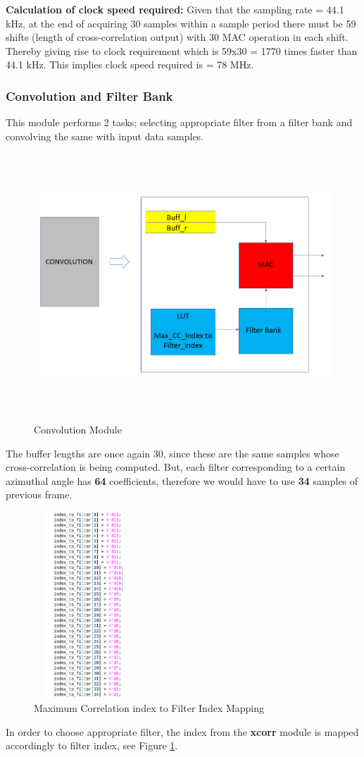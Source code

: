 \documentclass[BTech]{nitkdiss}
\begin{document}
\textbf{Calculation of clock speed required:} Given that the sampling rate = 44.1 kHz, at the end of acquiring 30 samples within a sample period there must be 59 shifts (length of cross-correlation output) with 30 MAC operation in each shift. Thereby giving rise to clock requirement which is 59x30 = 1770 times faster than 44.1 kHz. This implies clock speed required is = 78 MHz.


\subsubsection{Convolution and Filter Bank}
This module performs 2 tasks; selecting appropriate filter from a filter bank and convolving the same with input data samples. 
\begin{figure}[h!]
\includegraphics[width = \textwidth, height = 10cm]{conv_filter}
\caption{Convolution Module}
\end{figure}
The buffer lengths are once again 30, since these are the same samples whose cross-correlation is being computed. But, each filter corresponding to a certain azimuthal angle has \textbf{64} coefficients, therefore we would have to use \textbf{34} samples of previous frame. 
\begin{figure}[h!]
\centering
\includegraphics[width = 4cm, height = 7cm]{index1}
\caption{Maximum Correlation index to Filter Index Mapping} 
\label{fig : Index mapping}
\end{figure}
\newline In order to choose appropriate filter, the index from the \textbf{xcorr} module is mapped accordingly to filter index, see Figure \ref{fig : Index mapping}. 
\end{document}
